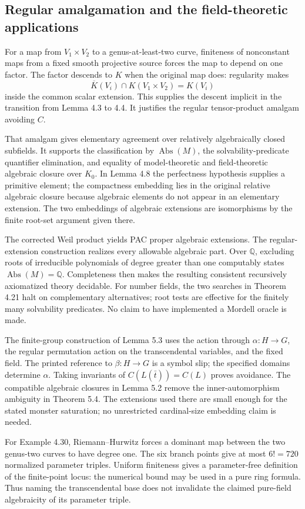 \documentclass[10pt]{article}
\begin{document}
\subsection*{Regular amalgamation and the field-theoretic applications}
For a map from \(V_1\times V_2\) to a genus-at-least-two curve, finiteness of nonconstant maps from a fixed smooth projective source forces the map to depend on one factor. The factor descends to \(K\) when the original map does: regularity makes \[\overline K(V_i)\cap K(V_1\times V_2)=K(V_i)\] inside the common scalar extension. This supplies the descent implicit in the transition from Lemma 4.3 to 4.4. It justifies the regular tensor-product amalgam avoiding \(C\).\par
That amalgam gives elementary agreement over relatively algebraically closed subfields. It supports the classification by \(\operatorname{Abs}(M)\), the solvability-predicate quantifier elimination, and equality of model-theoretic and field-theoretic algebraic closure over \(K_0\). In Lemma 4.8 the perfectness hypothesis supplies a primitive element; the compactness embedding lies in the original relative algebraic closure because algebraic elements do not appear in an elementary extension. The two embeddings of algebraic extensions are isomorphisms by the finite root-set argument given there.\par
The corrected Weil product yields PAC proper algebraic extensions. The regular-extension construction realizes every allowable algebraic part. Over \(\mathbb Q\), excluding roots of irreducible polynomials of degree greater than one computably states \(\operatorname{Abs}(M)=\mathbb Q\). Completeness then makes the resulting consistent recursively axiomatized theory decidable. For number fields, the two searches in Theorem 4.21 halt on complementary alternatives; root tests are effective for the finitely many solvability predicates. No claim to have implemented a Mordell oracle is made.\par
The finite-group construction of Lemma 5.3 uses the action through \(\alpha:H\to G\), the regular permutation action on the transcendental variables, and the fixed field. The printed reference to \(\beta:H\to G\) is a symbol slip; the specified domains determine \(\alpha\). Taking invariants of \(C(L(\bar t))=C(L)\) proves avoidance. The compatible algebraic closures in Lemma 5.2 remove the inner-automorphism ambiguity in Theorem 5.4. The extensions used there are small enough for the stated monster saturation; no unrestricted cardinal-size embedding claim is needed.\par
For Example 4.30, Riemann–Hurwitz forces a dominant map between the two genus-two curves to have degree one. The six branch points give at most \(6!=720\) normalized parameter triples. Uniform finiteness gives a parameter-free definition of the finite-point locus: the numerical bound may be used in a pure ring formula. Thus naming the transcendental base does not invalidate the claimed pure-field algebraicity of its parameter triple.\par
\end{document}
